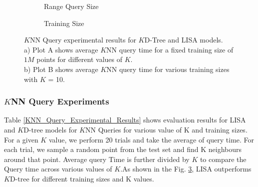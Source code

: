 \begin{figure}
 \centering
     \begin{subfigure}[h]{0.45\textwidth}
         \centering
         
         \caption{Range Query Size}
         \label{fig:2d_exp2_3_1}
     \end{subfigure}
     \begin{subfigure}[h]{0.45\textwidth}
         \centering
         
         \caption{Training Size}
         \label{fig:2d_exp2_3_2}
     \end{subfigure}
     \caption{$K$NN Query experimental results for $K$D-Tree and LISA models.\\
     a) Plot A shows average $K$NN query time for a fixed training size of $1M$ points for different values of $K$. \\
     b) Plot B shows average $K$NN query time for various training sizes with $K$ = 10. }
        \label{fig:KNN_Query_Comparision}
\end{figure}

\subsubsection {$K$NN Query Experiments}
Table \ref{KNN_Query_Experimental_Results} shows evaluation results for LISA and $K$D-tree models for $K$NN Queries for various value of K and training sizes. For a given $K$ value, we perform 20 trials and take the average of query time. For each trial, we sample a random point from the test set and find K neighbours around that point. Average query Time is further divided by $K$ to compare the Query time across various values of $K$.As shown in the Fig. \ref{fig:KNN_Query_Comparision}, LISA outperforms $K$D-tree for different training sizes and K values.


